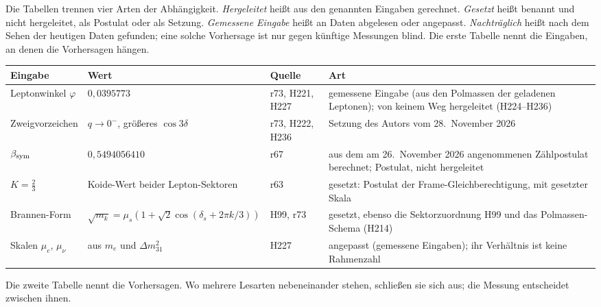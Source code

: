 Die Tabellen trennen vier Arten der Abhängigkeit. \emph{Hergeleitet} heißt aus den genannten Eingaben gerechnet. \emph{Gesetzt} heißt
benannt und nicht hergeleitet, als Postulat oder als Setzung. \emph{Gemessene Eingabe} heißt an Daten abgelesen oder angepasst.
\emph{Nachträglich} heißt nach dem Sehen der heutigen Daten gefunden; eine solche Vorhersage ist nur gegen künftige Messungen blind. Die erste
Tabelle nennt die Eingaben, an denen die Vorhersagen hängen.

\begin{center}
\small
\begin{tabular}{@{}p{.17\linewidth}p{.25\linewidth}p{.13\linewidth}p{.35\linewidth}@{}}
\hline
\textbf{Eingabe} & \textbf{Wert} & \textbf{Quelle} & \textbf{Art}\\
\hline
\raggedright Leptonwinkel \(\varphi\) & \raggedright \(0{,}0395773\) & \raggedright r73, H221, H227 & \raggedright gemessene Eingabe (aus den Polmassen der geladenen Leptonen); von keinem Weg hergeleitet (H224--H236)\tabularnewline
\raggedright Zweigvorzeichen & \raggedright \(q\to0^-\), größeres \(\cos3\delta\) & \raggedright r73, H222, H236 & \raggedright Setzung des Autors vom 28.~November 2026\tabularnewline
\raggedright \(\beta_{\rm sym}\) & \raggedright \(0{,}5494056410\) & \raggedright r67 & \raggedright aus dem am 26.~November 2026 angenommenen Zählpostulat berechnet; Postulat, nicht hergeleitet\tabularnewline
\raggedright \(K=\tfrac23\) & \raggedright Koide-Wert beider Lepton-Sektoren & \raggedright r63 & \raggedright gesetzt: Postulat der Frame-Gleichberechtigung, mit gesetzter Skala\tabularnewline
\raggedright Brannen-Form & \raggedright \(\sqrt{m_k}=\mu_s(1+\sqrt2\cos(\delta_s+2\pi k/3))\) & \raggedright H99, r73 & \raggedright gesetzt, ebenso die Sektorzuordnung H99 und das Polmassen-Schema (H214)\tabularnewline
\raggedright Skalen \(\mu_e\), \(\mu_\nu\) & \raggedright aus \(m_e\) und \(\Delta m^2_{31}\) & \raggedright H227 & \raggedright angepasst (gemessene Eingaben); ihr Verhältnis ist keine Rahmenzahl\tabularnewline
\hline
\end{tabular}
\end{center}

\noindent Die zweite Tabelle nennt die Vorhersagen. Wo mehrere Lesarten nebeneinander stehen, schließen sie sich aus; die Messung entscheidet
zwischen ihnen.


